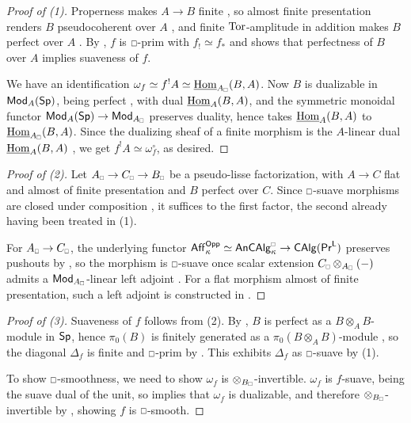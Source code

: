 \begin{proof}[Proof of (1)]
    Properness makes $A\to B$ finite \cite[Prop. 5.2.1.1]{SAG}, so almost finite presentation renders $B$ pseudocoherent over $A$ \cite[Cor. 5.2.2.2]{SAG}, and finite $\mathrm{Tor}$-amplitude in addition makes $B$ perfect over $A$ \cite[Prop. 7.2.4.23]{HA}. By , $f$ is $\msld$-prim with $f_{!}\simeq f_{*}$ and \cite[Lem. 4.5.10]{HeyerMann6FF} shows that perfectness of $B$ over $A$ implies suaveness of $f$. 

    We have an identification $\omega_{f}\simeq f^{!}A\simeq\intHom_{A_{\sld}}(B, A)$. Now $B$ is dualizable in $\mathsf{Mod}_{A}(\mathsf{Sp})$, being perfect \cite[Prop. 7.2.4.4]{HA}, with dual $\underline{\mathrm{Hom}}_{A}(B,A)$, and the symmetric monoidal functor $\Mod_{A}(\Sp)\to\Mod_{A_{\sld}}$ preserves duality, hence takes $\underline{\mathrm{Hom}}_{A}(B,A)$ to $\intHom_{A_{\sld}}(B, A)$. Since the dualizing sheaf of a finite morphism is the $A$-linear dual $\underline{\mathrm{Hom}}_{A}(B,A)$ \cite[Ex. 6.0.4.3]{SAG}, we get $f^{!}A\simeq\omega_{f}^{\circ}$, as desired. 
\end{proof}
\begin{proof}[Proof of (2)]
    Let $A_{\sld}\to C_{\sld}\to B_{\sld}$ be a pseudo-lisse factorization, with $A\to C$ flat and almost of finite presentation and $B$ perfect over $C$. Since $\msld$-suave morphisms are closed under composition \cite[Lem. 4.5.9]{HeyerMann6FF}, it suffices to the first factor, the second already having been treated in (1). 

    For $A_{\sld}\to C_{\sld}$, the underlying functor $\Aff_{\kappa}^{\Opp}\simeq\An\CAlg^{\sld}_{\kappa}\to\CAlg(\PrL)$ preserves pushouts by , so the morphism is $\msld$-suave once scalar extension $C_{\sld}\otimes_{A_{\sld}}(-)$ admits a $\Mod_{A_{\sld}}$-linear left adjoint \cite[Lem. 6.3.6]{CamargoSolid}. For a flat morphism almost of finite presentation, such a left adjoint is constructed in . 
\end{proof}
\begin{proof}[Proof of (3)]
    Suaveness of $f$ follows from (2). By \cite[Prop. 11.3.3.1]{SAG}, $B$ is perfect as a $B\otimes_{A}B$-module in $\mathsf{Sp}$, hence $\pi_{0}(B)$ is finitely generated as a $\pi_{0}(B\otimes_{A}B)$-module \cite[Cor. 7.2.4.5]{HA}, so the diagonal $\Delta_{f}$ is finite and $\msld$-prim by . This exhibits $\Delta_{f}$ as $\msld$-suave by (1). 

    To show $\msld$-smoothness, we need to show $\omega_{f}$ is $\otimes_{B_{\sld}}$-invertible. $\omega_{f}$ is $f$-suave, being the suave dual of the unit, so \cite[Cor. 4.5.18 (ii)]{HeyerMann6FF} implies that $\omega_{f}$ is dualizable, and therefore $\otimes_{B_{\sld}}$-invertible by \cite[Rmk. 4.5.12]{HeyerMann6FF}, showing $f$ is $\msld$-smooth. 
\end{proof}
